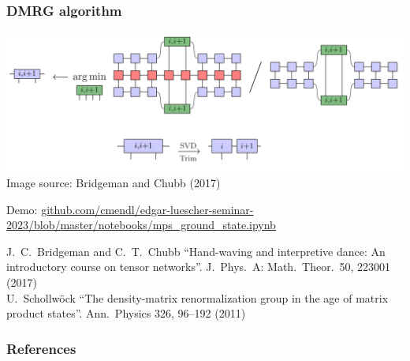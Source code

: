 \documentclass[t]{beamer}
\begin{document}
\begin{frame}
\frametitle{DMRG algorithm}
\vspace{1cm}

\begin{center}
\includegraphics[width=\textwidth]{dmrg_step.png}\\
{\small Image source: Bridgeman and Chubb (2017)}
\end{center}

{\small Demo: {\href{https://github.com/cmendl/edgar-luescher-seminar-2023/blob/master/notebooks/mps_ground_state.ipynb}{github.com/cmendl/edgar-luescher-seminar-2023/blob/master/notebooks/mps\_ground\_state.ipynb}}}

{\footnotesize
{J.~C.~Bridgeman and C.~T.~Chubb} ``Hand-waving and interpretive dance: An introductory course on tensor networks''. J.~Phys.~A: Math.~Theor.~50, 223001 (2017)\nocite{BridgemanChubb2017}\\
{U.~Schollw\"ock} ``The density-matrix renormalization group in the age of matrix product states''. Ann.~Physics 326, 96--192 (2011)\nocite{Schollwoeck2011}%
}
\end{frame}



\begin{frame}
\frametitle{References}
{\small
\printbibliography
}
\end{frame}
\end{document}
